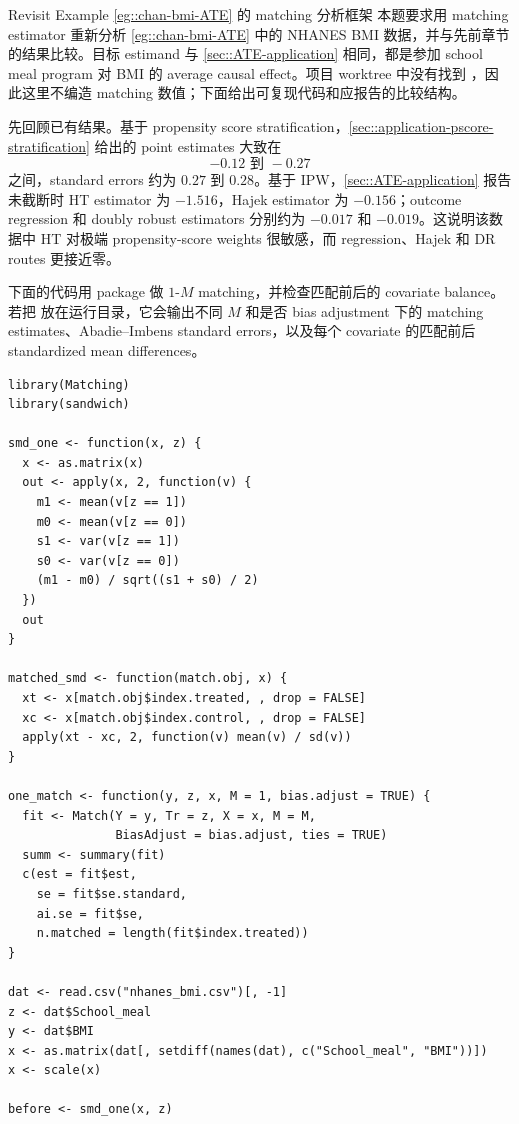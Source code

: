 \begin{exercisesolution}{Revisit Example \cref{eg::chan-bmi-ATE}}{ 的 matching 分析框架}
本题要求用 matching estimator 重新分析 \cref{eg::chan-bmi-ATE} 中的 NHANES BMI 数据，并与先前章节的结果比较。目标 estimand 与 \cref{sec::ATE-application} 相同，都是参加 school meal program 对 BMI 的 average causal effect。项目 worktree 中没有找到 ，因此这里不编造 matching 数值；下面给出可复现代码和应报告的比较结构。

先回顾已有结果。基于 propensity score stratification，\cref{sec::application-pscore-stratification} 给出的 point estimates 大致在
\[
-0.12 \text{ 到 } -0.27
\]
之间，standard errors 约为 $0.27$ 到 $0.28$。基于 IPW，\cref{sec::ATE-application} 报告未截断时 HT estimator 为 $-1.516$，Hajek estimator 为 $-0.156$；outcome regression 和 doubly robust estimators 分别约为 $-0.017$ 和 $-0.019$。这说明该数据中 HT 对极端 propensity-score weights 很敏感，而 regression、Hajek 和 DR routes 更接近零。

下面的代码用  package 做 $1$-$M$ matching，并检查匹配前后的 covariate balance。若把  放在运行目录，它会输出不同 $M$ 和是否 bias adjustment 下的 matching estimates、Abadie--Imbens standard errors，以及每个 covariate 的匹配前后 standardized mean differences。

\begin{lstlisting}
library(Matching)
library(sandwich)

smd_one <- function(x, z) {
  x <- as.matrix(x)
  out <- apply(x, 2, function(v) {
    m1 <- mean(v[z == 1])
    m0 <- mean(v[z == 0])
    s1 <- var(v[z == 1])
    s0 <- var(v[z == 0])
    (m1 - m0) / sqrt((s1 + s0) / 2)
  })
  out
}

matched_smd <- function(match.obj, x) {
  xt <- x[match.obj$index.treated, , drop = FALSE]
  xc <- x[match.obj$index.control, , drop = FALSE]
  apply(xt - xc, 2, function(v) mean(v) / sd(v))
}

one_match <- function(y, z, x, M = 1, bias.adjust = TRUE) {
  fit <- Match(Y = y, Tr = z, X = x, M = M,
               BiasAdjust = bias.adjust, ties = TRUE)
  summ <- summary(fit)
  c(est = fit$est,
    se = fit$se.standard,
    ai.se = fit$se,
    n.matched = length(fit$index.treated))
}

dat <- read.csv("nhanes_bmi.csv")[, -1]
z <- dat$School_meal
y <- dat$BMI
x <- as.matrix(dat[, setdiff(names(dat), c("School_meal", "BMI"))])
x <- scale(x)

before <- smd_one(x, z)


\end{lstlisting}
\end{exercisesolution}
